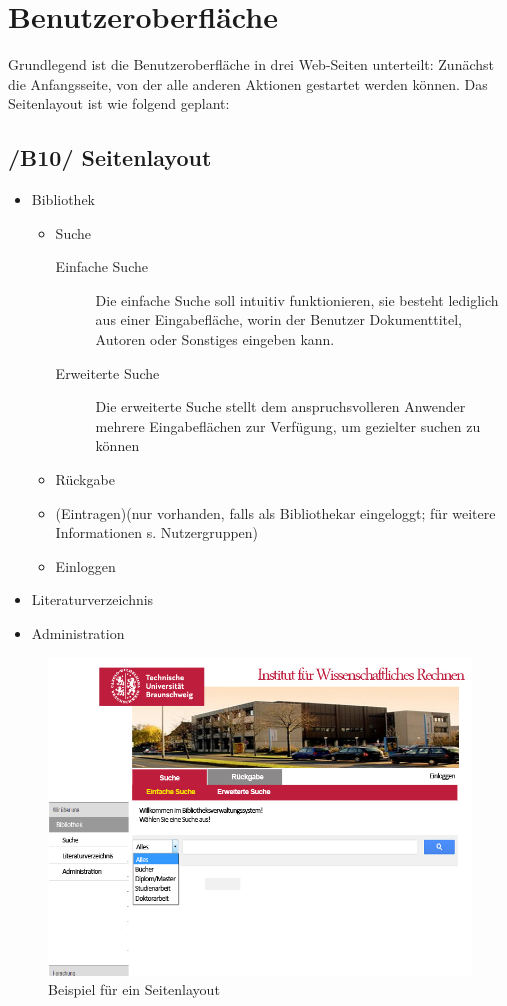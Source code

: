\chapter{Benutzeroberfläche}

Grundlegend ist die Benutzeroberfläche in drei Web-Seiten unterteilt:
Zunächst die Anfangsseite, von der alle anderen Aktionen gestartet werden können.
Das Seitenlayout ist wie folgend geplant:


\section{/B10/ Seitenlayout}

 \begin{itemize}
   \item Bibliothek
   \begin{itemize}
    \item Suche
      \begin{description}
       \item[Einfache Suche] Die einfache Suche soll intuitiv funktionieren, sie besteht lediglich aus einer Eingabefläche, worin der Benutzer
       Dokumenttitel, Autoren oder Sonstiges eingeben kann. 
       \item[Erweiterte Suche] Die erweiterte Suche stellt dem anspruchsvolleren Anwender mehrere Eingabeflächen zur Verfügung, um gezielter suchen zu können 
       \end{description}
      \item Rückgabe
      \item (Eintragen)(nur vorhanden, falls als Bibliothekar eingeloggt; für weitere Informationen s. Nutzergruppen)
      \item Einloggen
    \end{itemize}
    \item Literaturverzeichnis
    \item Administration
 \end{itemize}
 
\begin{figure}
\includegraphics[width=0.8\linewidth]{bilder/layout2.jpg}
\caption{Beispiel für ein Seitenlayout}
\end{figure}

